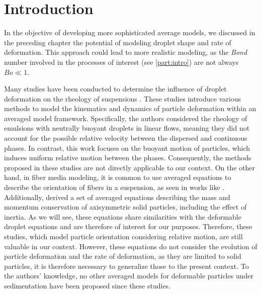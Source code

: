 \section{Introduction}
\label{sec:intro_ellipse}
In the objective of developing more sophisticated average models, we discussed in the preceding chapter the potential of modeling droplet shape and rate of deformation. 
This approach could lead to more realistic modeling, as the \textit{Bond} number involved in the processes of interest (see \ref{part:intro}) are not always $Bo\ll 1$. 

Many studies have been conducted to determine the influence of droplet deformation on the rheology of suspensions \citep{goddard1967nonlinear,lhuillier1987phenomenology,maffettone1998equation,raja2010inertial,mwasame2017macroscopic}.
These studies introduce various methods to model the kinematics and dynamics of particle deformation within an averaged model framework. 
Specifically, the authors considered the rheology of emulsions with neutrally buoyant droplets in linear flows, meaning they did not account for the possible relative velocity between the dispersed and continuous phases. 
In contrast, this work focuses on the buoyant motion of particles, which induces uniform relative motion between the phases. 
Consequently, the methods proposed in these studies are not directly applicable to our context. 
On the other hand, in fiber media modeling, it is common to use averaged equations to describe the orientation of fibers in a suspension, as seen in works like \citep{wang2008objective}. 
Additionally, \citet{curtiss1956kinetic} derived a set of averaged equations describing the mass and momentum conservation of axisymmetric solid particles, including the effect of inertia. 
As we will see, these equations share similarities with the deformable droplet equations and are therefore of interest for our purposes.
Therefore, these studies, which model particle orientation considering relative motion, are still valuable in our context. 
However, these equations do not consider the evolution of particle deformation and the rate of deformation, as they are limited to solid particles, it is therefore necessary to generalize those to the present context.  
To the authors' knowledge, no other averaged models for deformable particles under sedimentation have been proposed since these studies. 

